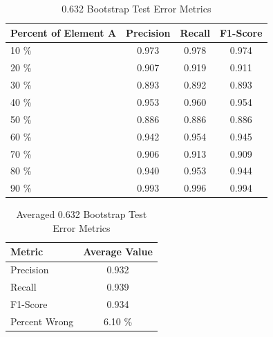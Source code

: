 \documentclass[11pt]{article}
\begin{document}
\begin{table}[h!]
\caption{0.632 Bootstrap Test Error Metrics}
\label{632_res}
\vspace{3mm}
\centering
\begin{tabular}{lccc}
\toprule
\multicolumn{1}{l}{Percent of Element A}  & \multicolumn{1}{c}{Precision} & \multicolumn{1}{c}{Recall} & \multicolumn{1}{c}{F1-Score} \\
\midrule
10 \% & 0.973 & 0.978 & 0.974 \\
20 \% & 0.907 & 0.919 & 0.911 \\
30 \% & 0.893 & 0.892 & 0.893 \\
40 \% & 0.953 & 0.960 & 0.954 \\
50 \% & 0.886 & 0.886 & 0.886 \\
60 \% & 0.942 & 0.954 & 0.945 \\
70 \% & 0.906 & 0.913 & 0.909 \\
80 \% & 0.940 & 0.953 & 0.944 \\
90 \% & 0.993 & 0.996 & 0.994 \\
\bottomrule
\end{tabular}
\end{table}

\begin{table}[h!]
\caption{Averaged 0.632 Bootstrap Test Error Metrics}
\label{avg_632_res}
\vspace{3mm}
\centering
\begin{tabular}{lc}
\toprule
\multicolumn{1}{l}{Metric}  & \multicolumn{1}{c}{Average Value}  \\
\midrule
Precision & 0.932 \\
Recall & 0.939 \\
F1-Score & 0.934 \\
Percent Wrong & 6.10 \% \\
\bottomrule
\end{tabular}
\end{table}
\end{document}
